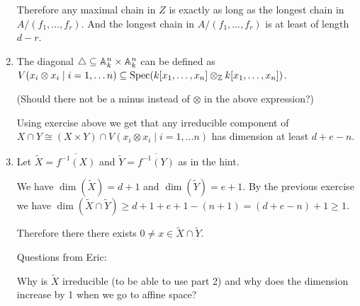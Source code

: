 \begin{exercise}{1}
\begin{enumerate}
{                Therefore any maximal chain in $Z$ is exactly as long as the
                longest chain in $A / (f_1, \dots, f_r)$. And the longest chain
                in $A / (f_1, \dots, f_r)$ is at least of length $d - r$.
            }
        \item{
                The diagonal $\triangle \subseteq \mathbb{A}^n_k \times \mathbb{A}^n_k$ can
                be defined as $V(x_i \otimes x_i \mid i = 1, \dots n) \subseteq
                \operatorname{Spec}(k[x_1, \dots, x_n] \otimes_{\mathbb{Z}} k[x_1, \dots, x_n])$.

                (Should there not be a minus instead of $\otimes$ in the above expression?)

                Using exercise above we get that any irreducible component of
                $X \cap Y \cong (X \times Y) \cap V(x_i \otimes x_i \mid i = 1,
                \dots n)$ has dimension at least $d + e - n$.
            }
        \item{
                Let $\tilde{X} = \overline{f^{-1}(X)}$ and $\tilde{Y} = \overline{f^{-1}(Y)}$ as in
                the hint.

                We have $\dim(\tilde{X}) = d + 1$ and $\dim(\tilde{Y}) = e + 1$.
                By the previous exercise we have $\dim(\tilde{X} \cap \tilde{Y})
                \geq d + 1 + e + 1 - (n + 1) = (d + e - n) + 1 \geq 1$.

                Therefore there there exists $0 \not= x \in \tilde{X} \cap
                \tilde{Y}$.

                Questions from Eric:
                
                Why is $\tilde{X}$ irreducible (to be able to use part 2) and why does the dimension 
                increase by 1 when we go to affine space?

            }
    \end{enumerate}
\end{exercise}


